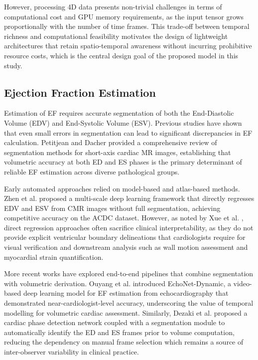 \documentclass[final,3p,times,twocolumn]{elsarticle}
\begin{document}
However, processing 4D data presents non-trivial challenges in terms of computational cost and GPU memory requirements, as the input tensor grows proportionally with the number of time frames. This trade-off between temporal richness and computational feasibility motivates the design of lightweight architectures that retain spatio-temporal awareness without incurring prohibitive resource costs, which is the central design goal of the proposed model in this study.

\subsection{Ejection Fraction Estimation}
Estimation of EF requires accurate segmentation of both the End-Diastolic Volume (EDV) and End-Systolic Volume (ESV). Previous studies have shown that even small errors in segmentation can lead to significant discrepancies in EF calculation. Petitjean and Dacher \cite{b17} provided a comprehensive review of segmentation methods for short-axis cardiac MR images, establishing that volumetric accuracy at both ED and ES phases is the primary determinant of reliable EF estimation across diverse pathological groups.

Early automated approaches relied on model-based and atlas-based methods. Zhen et al. \cite{b18} proposed a multi-scale deep learning framework that directly regresses EDV and ESV from CMR images without full segmentation, achieving competitive accuracy on the ACDC dataset. However, as noted by Xue et al. \cite{b19}, direct regression approaches often sacrifice clinical interpretability, as they do not provide explicit ventricular boundary delineations that cardiologists require for visual verification and downstream analysis such as wall motion assessment and myocardial strain quantification.

More recent works have explored end-to-end pipelines that combine segmentation with volumetric derivation. Ouyang et al. \cite{b20} introduced EchoNet-Dynamic, a video-based deep learning model for EF estimation from echocardiography that demonstrated near-cardiologist-level accuracy, underscoring the value of temporal modelling for volumetric cardiac assessment. Similarly, Dezaki et al. \cite{b21} proposed a cardiac phase detection network coupled with a segmentation module to automatically identify the ED and ES frames prior to volume computation, reducing the dependency on manual frame selection which remains a source of inter-observer variability in clinical practice.
\end{document}
